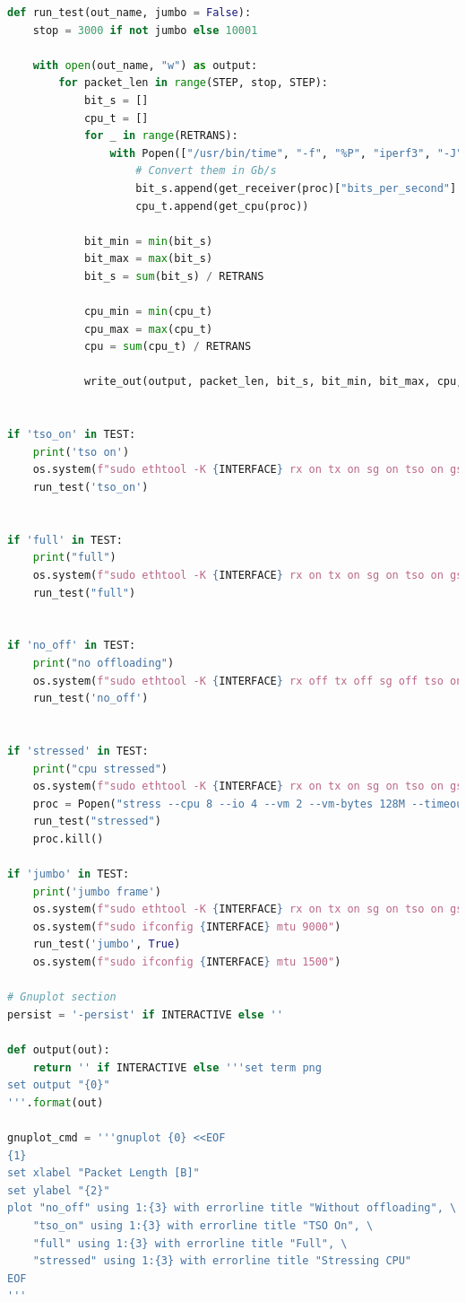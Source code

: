 \documentclass{exam}
\begin{document}
\begin{lstlisting}[language=python]
def run_test(out_name, jumbo = False):
    stop = 3000 if not jumbo else 10001

    with open(out_name, "w") as output:
        for packet_len in range(STEP, stop, STEP):
            bit_s = []
            cpu_t = []
            for _ in range(RETRANS):
                with Popen(["/usr/bin/time", "-f", "%P", "iperf3", "-J", "-l", str(packet_len), "-c", SERVER], stdout=PIPE, stderr=PIPE) as proc:
                    # Convert them in Gb/s
                    bit_s.append(get_receiver(proc)["bits_per_second"] / 1e9)
                    cpu_t.append(get_cpu(proc))

            bit_min = min(bit_s)
            bit_max = max(bit_s)
            bit_s = sum(bit_s) / RETRANS

            cpu_min = min(cpu_t)
            cpu_max = max(cpu_t)
            cpu = sum(cpu_t) / RETRANS

            write_out(output, packet_len, bit_s, bit_min, bit_max, cpu, cpu_min, cpu_max, out_name)


if 'tso_on' in TEST:
    print('tso on')
    os.system(f"sudo ethtool -K {INTERFACE} rx on tx on sg on tso on gso off gro off")
    run_test('tso_on')


if 'full' in TEST:
    print("full")
    os.system(f"sudo ethtool -K {INTERFACE} rx on tx on sg on tso on gso on gro on")
    run_test("full")


if 'no_off' in TEST:
    print("no offloading")
    os.system(f"sudo ethtool -K {INTERFACE} rx off tx off sg off tso on gso off gro off")
    run_test('no_off')
        

if 'stressed' in TEST:
    print("cpu stressed")
    os.system(f"sudo ethtool -K {INTERFACE} rx on tx on sg on tso on gso on gro on")
    proc = Popen("stress --cpu 8 --io 4 --vm 2 --vm-bytes 128M --timeout 1000s".split())
    run_test("stressed")
    proc.kill()

if 'jumbo' in TEST:
    print('jumbo frame')
    os.system(f"sudo ethtool -K {INTERFACE} rx on tx on sg on tso on gso on gro on")
    os.system(f"sudo ifconfig {INTERFACE} mtu 9000")
    run_test('jumbo', True)
    os.system(f"sudo ifconfig {INTERFACE} mtu 1500")

# Gnuplot section
persist = '-persist' if INTERACTIVE else ''

def output(out): 
    return '' if INTERACTIVE else '''set term png
set output "{0}"
'''.format(out)

gnuplot_cmd = '''gnuplot {0} <<EOF
{1}
set xlabel "Packet Length [B]"
set ylabel "{2}"
plot "no_off" using 1:{3} with errorline title "Without offloading", \
    "tso_on" using 1:{3} with errorline title "TSO On", \
    "full" using 1:{3} with errorline title "Full", \
    "stressed" using 1:{3} with errorline title "Stressing CPU"
EOF
'''


\end{lstlisting}
\end{document}
